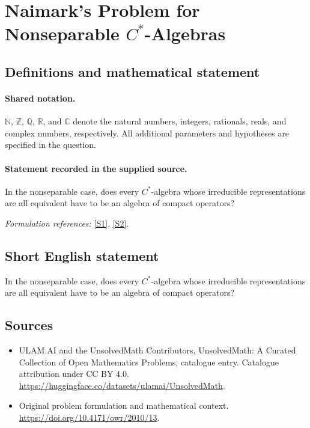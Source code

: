 \documentclass[11pt]{article}
\newcommand{\sref}[2]{\hyperlink{source:#1:#2}{[S#2]}}
\begin{document}
\section{\texorpdfstring{Naimark's Problem for Nonseparable $C^*$-Algebras}{Naimark's Problem for Nonseparable C\textasciicircum{}*-Algebras}}\label{statement}

\subsection{Definitions and mathematical statement}

\paragraph{Shared notation.}$\mathbb N$, $\mathbb Z$, $\mathbb Q$, $\mathbb R$, and $\mathbb C$ denote the natural numbers, integers, rationals, reals, and complex numbers, respectively. All additional parameters and hypotheses are specified in the question.


\paragraph{Statement recorded in the supplied source.}
In the nonseparable case, does every $C^*$-algebra whose irreducible representations are all equivalent have to be an algebra of compact operators?
\par\smallskip\textit{Formulation references:} \sref{statement}{1}, \sref{statement}{2}.
\subsection{Short English statement}
In the nonseparable case, does every $C^*$-algebra whose irreducible representations are all equivalent have to be an algebra of compact operators?
\subsection{Sources}
\begin{itemize}
\item[\hypertarget{source:statement:1}{S1}] ULAM.AI and the UnsolvedMath Contributors, UnsolvedMath: A Curated Collection of Open Mathematics Problems, catalogue entry. Catalogue attribution under CC BY 4.0.
\url{https://huggingface.co/datasets/ulamai/UnsolvedMath}.
\item[\hypertarget{source:statement:2}{S2}] Original problem formulation and mathematical context.
\url{https://doi.org/10.4171/owr/2010/13}.
\end{itemize}
\label{end:statement}
\end{document}
